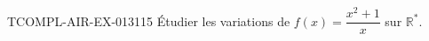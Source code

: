 \begin{exercice}{TCOMPL-AIR-EX-013}{1}{15}
Étudier les variations de $f(x) = \dfrac{x^2+1}{x}$ sur $\mathbb{R}^*$.

\end{exercice}
